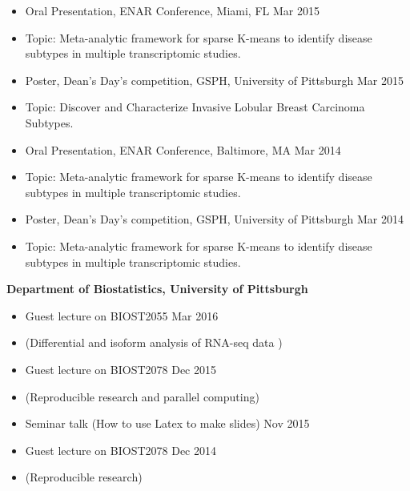 \documentclass[10pt]{article}
\newenvironment{innerlist}[1][\enskip\textbullet]%
        {\begin{itemize}[#1,leftmargin=*,parsep=0pt,itemsep=0pt,topsep=0pt,partopsep=0pt]}
        {\end{itemize}}
\newcommand{\halfblankline}{\quad\vspace{-0.5\baselineskip}\pagebreak[3]}
\begin{document}
\begin{innerlist}
\item Oral Presentation, ENAR Conference, Miami, FL \hfill {Mar 2015}
\item[] Topic: Meta-analytic framework for sparse K-means to identify disease\\ subtypes in multiple transcriptomic studies.
\end{innerlist}

\begin{innerlist}
\item Poster, Dean's Day's competition, GSPH, University of Pittsburgh \hfill {Mar 2015}
\item[] Topic: Discover and Characterize Invasive Lobular Breast Carcinoma Subtypes.
\end{innerlist}

\begin{innerlist}
\item Oral Presentation, ENAR Conference, Baltimore, MA \hfill {Mar 2014}
\item[] Topic: Meta-analytic framework for sparse K-means to identify disease\\ subtypes in multiple transcriptomic studies.
\end{innerlist}

\begin{innerlist}
\item Poster, Dean's Day's competition, GSPH, University of Pittsburgh \hfill {Mar 2014}
\item[] Topic: Meta-analytic framework for sparse K-means to identify disease\\ subtypes in multiple transcriptomic studies.
\end{innerlist}

\halfblankline

\textbf{Department of Biostatistics, University of Pittsburgh}
\begin{innerlist}
\item Guest lecture on BIOST2055  \hfill Mar 2016
\item[] (Differential and isoform analysis of RNA-seq data )
\item Guest lecture on BIOST2078  \hfill Dec 2015
\item[] (Reproducible research and parallel computing)
\item Seminar talk (How to use Latex to make slides) \hfill Nov 2015
\item Guest lecture on BIOST2078  \hfill Dec 2014
\item[] (Reproducible research)
\end{innerlist}
\end{document}
